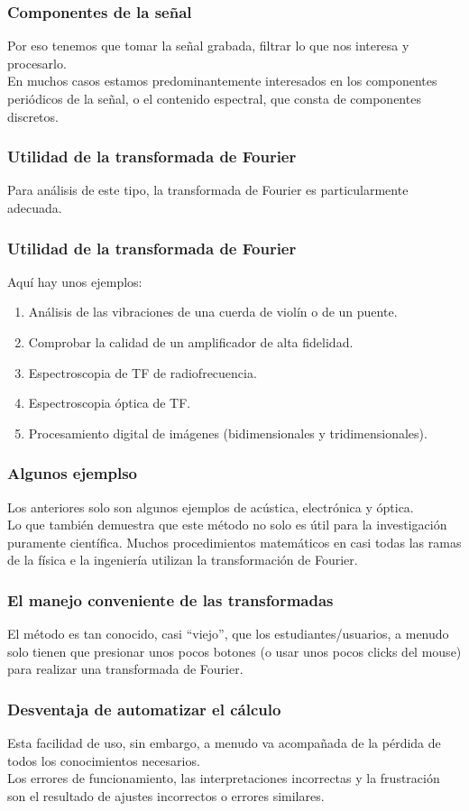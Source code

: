 \documentclass[12pt]{beamer}
\begin{document}
\begin{frame}
\frametitle{Componentes de la señal}
Por eso tenemos que tomar la señal grabada, filtrar lo que nos interesa y procesarlo.
\\
\bigskip
\pause
En muchos casos estamos predominantemente interesados en los componentes periódicos de la señal, o el contenido espectral, que consta de componentes discretos.
\end{frame}
\begin{frame}
\frametitle{Utilidad de la transformada de Fourier}
Para análisis de este tipo, la transformada de Fourier es particularmente adecuada.
\end{frame}
\begin{frame}
\frametitle{Utilidad de la transformada de Fourier}
Aquí hay unos ejemplos:
\pause
{}
\begin{enumerate}[<+->]
\item Análisis de las vibraciones de una cuerda de violín o de un puente.
\item Comprobar la calidad de un amplificador de alta fidelidad.
\item Espectroscopia de TF de radiofrecuencia.
\item Espectroscopia óptica de TF.
\item Procesamiento digital de imágenes (bidimensionales y tridimensionales).
\end{enumerate}
\end{frame}
\begin{frame}
\frametitle{Algunos ejemplso}
Los anteriores solo son algunos ejemplos de acústica, electrónica y óptica.
\\
\bigskip
\pause
Lo que también demuestra que este método no solo es útil para la investigación puramente científica. \pause Muchos procedimientos matemáticos en casi todas las ramas de la física e la ingeniería utilizan la transformación de Fourier.
\end{frame}
\begin{frame}
\frametitle{El manejo conveniente de las transformadas}
El método es tan conocido, casi \enquote{viejo}, que los estudiantes/usuarios, a menudo solo tienen que presionar unos pocos botones (o usar unos pocos clicks del mouse) para realizar una transformada de Fourier.
\end{frame}
\begin{frame}
\frametitle{Desventaja de automatizar el cálculo}
Esta facilidad de uso, sin embargo, a menudo va acompañada de la pérdida de todos los conocimientos necesarios.
\\
\bigskip
\pause
Los errores de funcionamiento, las interpretaciones incorrectas y la frustración son el resultado de ajustes incorrectos o errores similares.
\end{frame}
\end{document}
